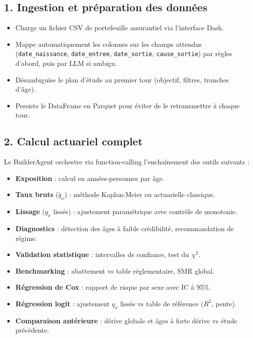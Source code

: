 \documentclass[12pt,a4paper]{article}
\begin{document}
\begin{capabilitybox}

\subsection*{1. Ingestion et préparation des données}
\begin{itemize}[leftmargin=1.5em]
  \item Charge un fichier CSV de portefeuille assurantiel via l'interface Dash.
  \item Mappe automatiquement les colonnes sur les champs attendus
        (\texttt{date\_naissance}, \texttt{date\_entree}, \texttt{date\_sortie},
        \texttt{cause\_sortie}) par règles d'abord, puis par LLM si ambigu.
  \item Désambiguïse le plan d'étude au premier tour (objectif, filtres, tranches d'âge).
  \item Persiste le DataFrame en Parquet pour éviter de le retransmettre à chaque tour.
\end{itemize}

\subsection*{2. Calcul actuariel complet}
Le BuilderAgent orchestre via function-calling l'enchaînement des outils suivants :
\begin{itemize}[leftmargin=1.5em]
  \item \textbf{Exposition} : calcul en années-personnes par âge.
  \item \textbf{Taux bruts} ($\hat{q}_x$) : méthode Kaplan-Meier ou actuarielle classique.
  \item \textbf{Lissage} ($q_x$ lissés) : ajustement paramétrique avec contrôle de monotonie.
  \item \textbf{Diagnostics} : détection des âges à faible crédibilité, recommandation de régime.
  \item \textbf{Validation statistique} : intervalles de confiance, test du $\chi^2$.
  \item \textbf{Benchmarking} : abattement vs table réglementaire, SMR global.
  \item \textbf{Régression de Cox} : rapport de risque par sexe avec IC à 95\%.
  \item \textbf{Régression logit} : ajustement $q_x$ lissés vs table de référence ($R^2$, pente).
  \item \textbf{Comparaison antérieure} : dérive globale et âges à forte dérive vs étude précédente.
\end{itemize}


\end{capabilitybox}
\end{document}
